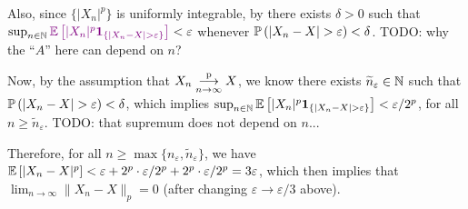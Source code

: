 \begin{enumerate}
\begin{pf}
Also, since \(\{|X_n|^{p}\}\) is uniformly integrable, by 
there exists \(\delta>0\) such that
\(\sup_{n\in\N}\vc{\expv{|X_n|^{p}\indicset{|X_n-X|>\varepsilon}}}<\varepsilon\)
whenever \(\prob{|X_n-X|>\varepsilon}<\delta\). TODO: why the ``\(A\)'' here
can depend on \(n\)?

Now, by the assumption
that \(X_n\underset{n\to\infty}{\overset{\text{p}}{\longrightarrow}} X\), we know there exists \(\widetilde{n}_{\varepsilon}\in\mathbb{N}\)
such that \(\prob{|X_n-X|>\varepsilon}<\delta\), which implies
\(\sup_{n\in\N}\expv{|X_n|^{p}\indicset{|X_n-X|>\varepsilon}}<\varepsilon/2^p\),
for all \(n\ge\widetilde{n}_{\varepsilon}\). TODO: that supremum does not
depend on \(n\)...

Therefore, for all \(n\ge\max\{n_{\varepsilon},\widetilde{n}_{\varepsilon}\}\),
we have \(\mathbb{E}\left[|X_n-X|^{p}\right]<\varepsilon+2^p\cdot \varepsilon/2^p+2^p\cdot
\varepsilon/2^p=3\varepsilon\), which then implies that
\(\lim_{n\to\infty}\|X_n-X\|_{p}=0\) (after changing
\(\varepsilon\to\varepsilon/3\) above).
\end{pf}
\end{enumerate}
